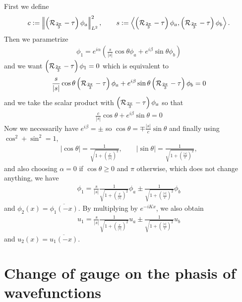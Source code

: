 \documentclass[11pt,a4paper,reqno,french,tikz]{amsart}
\renewcommand{\ge}{\geqslant}\renewcommand{\le}{\leqslant}
\newcommand{\pa}[1]{\left( #1 \right)} %
\newcommand{\ab}[1]{\left|#1\right|} %
\newcommand{\ps}[1]{\left< #1 \right>} %
\newcommand{\nor}[2]{ \left| \! \left| #1 \right| \! \right|_{#2} } %
\newcommand{\f}[2]{\frac{#1}{#2}} %
\begin{document}
First we define
\begin{align*}
c := \nor{\pa{\cR_{\f{2\pi}{3}} -\tau}\phi_a}{L^2}^2, \qquad s := \ps{\pa{\cR_{\f{2\pi}{3}} -\tau}\phi_a,\pa{\cR_{\f{2\pi}{3}} -\tau}\phi_b}.
\end{align*}
Then we parametrize
\begin{align*}
\phi_1 = e^{i \alpha} \pa{\f s{\ab{s}} \cos \theta \phi_a + e^{i\beta} \sin \theta \phi_b}
\end{align*}
and we want $\pa{\cR_{\f{2\pi}{3}} -\tau}\phi_1 = 0$ which is equivalent to
\begin{align*}
\f s{\ab{s}}\cos \theta \pa{\cR_{\f{2\pi}{3}} -\tau}\phi_a + e^{i\beta} \sin \theta \pa{\cR_{\f{2\pi}{3}} -\tau}\phi_b =0
\end{align*}
and we take the scalar product with $\pa{\cR_{\f{2\pi}{3}} -\tau}\phi_a$ so that
\begin{align*}
\f c{\ab{s}}\cos \theta  + e^{i\beta} \sin \theta =0
\end{align*}
Now we necessarily have $e^{i\beta} = \pm$ so $\cos \theta = \mp \f {\ab{s}}c \sin \theta$ and finally using $\cos^2 + \sin^2 = 1$,
\begin{align*}
\ab{\cos \theta} = \f 1{\sqrt{1+ \pa{\f c{\ab{s}}}^2}}, \qquad \ab{\sin \theta} = \f 1{\sqrt{1+ \pa{\f {\ab{s}}c}^2}},
\end{align*}
and also choosing $\alpha = 0$ if $\cos \theta \ge 0$ and $\pi$ otherwise, which does not change anything, we have
\begin{align*}
\phi_1 = \f{s}{\ab{s}}\f 1{\sqrt{1+ \pa{\f c{\ab{s}}}^2}} \phi_a \pm \f 1{\sqrt{1+ \pa{\f {\ab{s}}c}^2}} \phi_b
\end{align*}
and $\phi_2(x) = \overline{\phi_1(-x)}$. By multiplying by $e^{-iKx}$, we also obtain
\begin{align*}
\boxed{u_1 = \f{s}{\ab{s}}\f 1{\sqrt{1+ \pa{\f c{\ab{s}}}^2}} u_a \pm \f 1{\sqrt{1+ \pa{\f {\ab{s}}c}^2}} u_b}
\end{align*}
and $u_2(x) = \overline{u_1(-x)}$.



\section{Change of gauge on the phasis of wavefunctions}%
\label{sec:change_of_gauge_on_the_phasis_of_wavefunctions}
\end{document}

